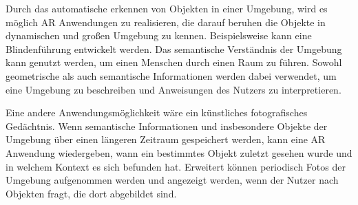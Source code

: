 Durch das automatische erkennen von Objekten in einer Umgebung, wird es möglich AR Anwendungen zu realisieren, die darauf beruhen die Objekte in dynamischen und großen Umgebung zu kennen. Beispielsweise kann eine Blindenführung entwickelt werden. Das semantische Verständnis der Umgebung kann genutzt werden, um einen Menschen durch einen Raum zu führen. Sowohl geometrische als auch semantische Informationen werden dabei verwendet, um eine Umgebung zu beschreiben und Anweisungen des Nutzers zu interpretieren.

Eine andere Anwendungsmöglichkeit wäre ein künstliches fotografisches Gedächtnis. Wenn semantische Informationen und insbesondere Objekte der Umgebung über einen längeren Zeitraum gespeichert werden, kann eine AR Anwendung wiedergeben, wann ein bestimmtes Objekt zuletzt gesehen wurde und in welchem Kontext es sich befunden hat. Erweitert können periodisch Fotos der Umgebung aufgenommen werden und angezeigt werden, wenn der Nutzer nach Objekten fragt, die dort abgebildet sind.






